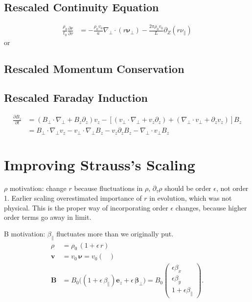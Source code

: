 \documentclass{article}
\newcommand{\para}{\parallel}
\newcommand{\ep}{\epsilon}
\newcommand{\np}{\nabla_\perp}
\newcommand{\p}{\partial}
\newcommand{\deriv}[2]{\frac{\p #1}{\p #2}}
\newcommand{\pth} [1] {\left( #1 \right) }
\newcommand{\br} [1] {\left[ #1 \right] }
\newcommand{\pmat} [1] {\begin{pmatrix} #1 \end{pmatrix}}
\begin{document}
\subsection{Rescaled Continuity Equation}
\begin{align*}
    \frac{\rho_0}{t_0}\deriv{r}{\tau} &= -\frac{\rho_0v_0}{a}\np\cdot\pth{r\bm{\nu}_\perp} - \frac{2\pi\rho_0v_0}{L} \p_Z\pth{r\nu_\para}
\end{align*}
or 

\subsection{Rescaled Momentum Conservation}

\subsection{Rescaled Faraday Induction}
\begin{align*} 
\deriv{B_z}{t} &= 
    \pth{B_\perp\cdot\np + B_z\p_z}v_z - \br{(v_\perp\cdot\np + v_z\p_z) + (\np\cdot v_\perp + \p_zv_z)} B_z \\
    &= B_\perp\cdot\np v_z - v_\perp\cdot\np B_z - v_z\p_zB_z - \np \cdot v_\perp B_z 
\end{align*}



\section{Improving Strauss's Scaling}
$\rho$ motivation: change $r$ because fluctuations in $\rho$, $\p_\tau \rho$ should be order $\ep$, not order 1. Earlier scaling overestimated importance of $r$ in evolution, which was not physical. This is the proper way of incorporating order $\ep$ changes, because higher order terms go away in limit. 

B motivation: $\beta_\para$ fluctuates more than we originally put. 
\begin{align*}
    \rho &= \rho_0\,(1 + \epsilon\,r)\\
    \bm{v} & = v_0\,\bm{\nu} = v_0 \pmat{} \\
    \bm{B} & = B_0\bigg((1 + \epsilon\,\beta_\parallel)\bm{e}_z + \epsilon\,\bm{\beta}_\perp\bigg) = B_0 \pmat{\ep\beta_x \\ \ep\beta_y \\ 1+\ep\beta_\para} .
\end{align*}
\end{document}
